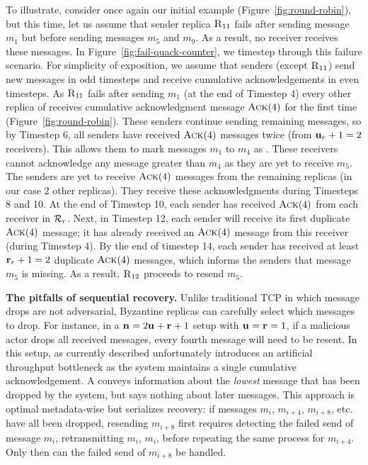 To illustrate, consider once again our initial example (Figure~\ref{fig:round-robin}), but this time, let us assume that sender replica $\textsc{R}_{{1}{1}}$ fails after sending message $m_1$ but before sending messages $m_5$ and $m_9$. As a result, no receiver receives these messages. In Figure~\ref{fig:fail-quack-counter}, we timestep through this failure scenario. For simplicity of exposition, we assume that senders (except $\textsc{R}_{{1}{1}}$) send new messages in odd timesteps and receive cumulative acknowledgements in even timesteps. 
%
As $\textsc{R}_{{1}{1}}$ fails after sending $m_1$ (at the end of Timestep 4) every other replica of  receives cumulative acknowledgment 
message $\textsc{Ack}(4)$ for the first time (Figure~\ref{fig:round-robin}).
These senders continue sending remaining messages, so by Timestep 6, all senders
have received  $\textsc{Ack}(4)$ messages twice (from $\textbf{u}_{r}+1 =2$ receivers). This allows them to mark messages $m_1$ to $m_4$ as . 
These receivers cannot acknowledge any message greater than $m_4$ as they are yet to receive $m_5$.
The senders are yet to receive $\textsc{Ack}(4)$ messages from the remaining replicas (in our case $2$ other replicas).
They receive these acknowledgments during Timesteps 8 and 10. 
At the end of Timestep 10, each sender has received $\textsc{Ack}(4)$ from each receiver in $\mathcal{R}_{r}$.
Next, in Timestep 12, each sender will receive its first duplicate $\textsc{Ack}(4)$ message; 
it has already received an $\textsc{Ack}(4)$ message from this receiver (during Timestep 4).
By the end of timestep 14, each sender has received at least $\textbf{r}_{r}+1 =2$ duplicate $\textsc{Ack}(4)$ messages, which 
informs the senders that message $m_5$ is missing.
As a result, $\textsc{R}_{{1}{2}}$ proceeds to resend $m_5$.


\par \textbf{The pitfalls of sequential recovery.} 
Unlike traditional TCP in which message drops are not adversarial, Byzantine replicas can carefully select which messages to drop. 
For instance,  in a $\textbf{n}_{} = 2\textbf{u}_{}+ \textbf{r}_{} +  1$ setup with $\textbf{u}_{} = \textbf{r}_{}= 1$, if a malicious actor drops all received messages, every fourth message will need to be resent.
In this setup, \Scrooge{} as currently described unfortunately introduces an artificial throughput bottleneck as the system maintains a single cumulative acknowledgement. A \quack{} conveys information about the \textit{lowest} message that has been dropped by the system, but says nothing about later messages.  This approach is optimal metadata-wise but serializes recovery: if messages $m_i$, $m_{i+4}$, $m_{i+8}$, etc. have all been dropped, 
resending $m_{i+8}$ first requires detecting the failed send of message $m_i$, retransmitting $m_i$, \quack{} $m_i$, before repeating
the same process for $m_{i+4}$. Only then can the failed send of $m_{i+8}$ be handled.


